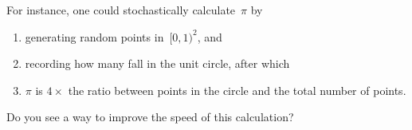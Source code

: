 For instance, one could stochastically calculate~$\pi$
by 
\begin{enumerate}
\item generating random points in~$[0,1)^2$, and
\item recording how many fall in the unit circle, after which
\item $\pi$ is $4\times$ the ratio between points in the circle
  and the total number of points.
\end{enumerate}


\begin{exercise}
  Do you see a way to improve the speed of this calculation?
\end{exercise}
